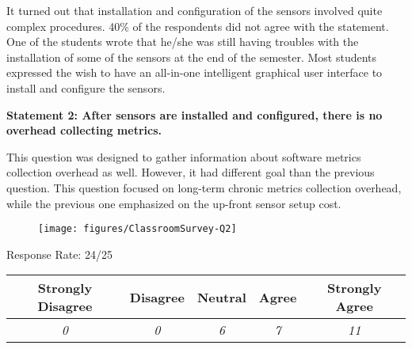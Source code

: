 It turned out that installation and configuration of the sensors involved quite complex procedures. 40\% of the respondents did not agree with the statement. One of the students wrote that he/she was still having troubles with the installation of some of the sensors at the end of the semester. Most students expressed the wish to have an all-in-one intelligent graphical user interface to install and configure the sensors.



\newpage
\textbf{Statement 2: After sensors are installed and configured, there is no overhead collecting metrics.}

This question was designed to gather information about software metrics collection overhead as well. However, it had different goal than the previous question. This question focused on long-term chronic metrics collection overhead, while the previous one emphasized on the up-front sensor setup cost.

\begin{quote}\end{quote} %

\begin{figure}[h]
  \center
  \texttt{[image: figures/ClassroomSurvey-Q2]}
  \label{fig:InClassSurvey-Q2}
\end{figure}

\begin{center}Response Rate: 24/25\end{center}
\begin{table}[h]
	\centering
		\begin{tabular}{|c|c|c|c|c|} 
			\hline
			\textbf{Strongly Disagree} & \textbf{Disagree} & \textbf{Neutral} & \textbf{Agree} & \textbf{Strongly Agree} \\
			\hline
			\textit{0} & \textit{0} & \textit{6} & \textit{7} &\textit{11} \\
			\hline
		\end{tabular}
	\label{table:InClassSurvey-Q2}
\end{table}

